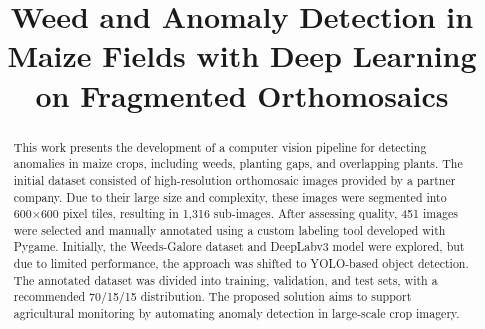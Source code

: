 \documentclass[10pt,conference]{IEEEtran}
\begin{document}
\title{Weed and Anomaly Detection in Maize Fields with Deep Learning on Fragmented Orthomosaics}
\newif\iffinal
\finaltrue
\iffinal
\else
  \author{ID do artigo Latin.science 2020: \cmtid \\ }
\fi
\maketitle
\thispagestyle{fancy}

\begin{abstract}
This work presents the development of a computer vision pipeline for detecting anomalies in maize crops, including weeds, planting gaps, and overlapping plants. The initial dataset consisted of high-resolution orthomosaic images provided by a partner company. Due to their large size and complexity, these images were segmented into 600×600 pixel tiles, resulting in 1,316 sub-images. After assessing quality, 451 images were selected and manually annotated using a custom labeling tool developed with Pygame. Initially, the Weeds-Galore dataset and DeepLabv3 model were explored, but due to limited performance, the approach was shifted to YOLO-based object detection. The annotated dataset was divided into training, validation, and test sets, with a recommended 70/15/15 distribution. The proposed solution aims to support agricultural monitoring by automating anomaly detection in large-scale crop imagery.
\end{abstract}
\end{document}
